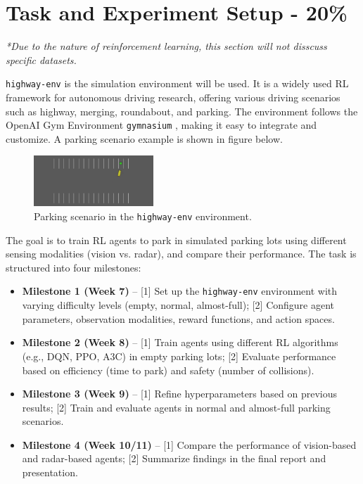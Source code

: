 \documentclass{article}
\begin{document}
\section{Task and Experiment Setup - 20\%}

\textit{*Due to the nature of reinforcement learning, this section will not disscuss specific datasets.}

\texttt{highway-env} \cite{highway-env} is the simulation environment will be used. It is a widely used RL framework for autonomous driving research, offering various driving scenarios such as highway, merging, roundabout, and parking. The environment follows the OpenAI Gym Environment \texttt{gymnasium} \cite{towers2024gymnasium}, making it easy to integrate and customize. A parking scenario example is shown in figure below.

\begin{figure}[h!]
    \centering
    \includegraphics[width=0.4\textwidth]{./pics/parking.png}
    \caption{Parking scenario in the \texttt{highway-env} environment.}
\end{figure}

The goal is to train RL agents to park in simulated parking lots using different sensing modalities (vision vs. radar), and compare their performance. The task is structured into four milestones:

\begin{itemize}
    \item \textbf{Milestone 1 (Week 7)} – [1] Set up the \texttt{highway-env} environment with varying difficulty levels (empty, normal, almost-full); [2] Configure agent parameters, observation modalities, reward functions, and action spaces.
    \item \textbf{Milestone 2 (Week 8)} – [1] Train agents using different RL algorithms (e.g., DQN, PPO, A3C) in empty parking lots; [2] Evaluate performance based on efficiency (time to park) and safety (number of collisions).
    \item \textbf{Milestone 3 (Week 9)} – [1] Refine hyperparameters based on previous results; [2] Train and evaluate agents in normal and almost-full parking scenarios.
    \item \textbf{Milestone 4 (Week 10/11)} – [1] Compare the performance of vision-based and radar-based agents; [2] Summarize findings in the final report and presentation.
\end{itemize}
\end{document}
